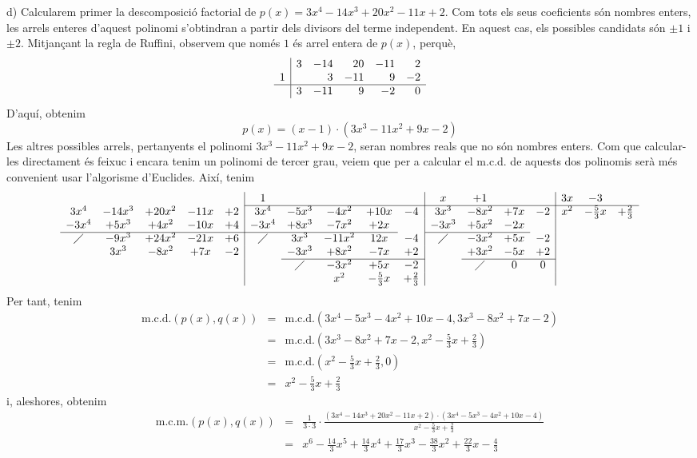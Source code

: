 \begin{solucio}
d) Calcularem primer la descomposició factorial de $p(x)=3x^{4}-14x^{3}+20x^{2}-11x+2$. Com tots els seus coeficients són nombres enters, les arrels enteres d'aquest polinomi s'obtindran a
partir dels divisors del terme independent. En aquest cas, els
possibles candidats són $\pm 1$ i $\pm 2$. Mitjançant la regla de Ruffini,
observem que només $1$ és arrel entera de $p(x)$, perquè,\[
\begin{array}{r|rrrrr}
& 3 & -14 & 20 & -11 & 2 \\
1 & & 3 & -11 & 9 & -2 \\\hline
& 3 & -11 & 9 & -2 & 0\end{array}\]D'aquí, obtenim\[
p(x)=(x-1)\cdot (3x^{3}-11x^{2}+9x-2)
\]Les altres possibles arrels, pertanyents el polinomi $3x^{3}-11x^{2}+9x-2$, seran nombres reals que no són nombres
enters. Com que calcular-les directament és feixuc i encara tenim un polinomi de tercer grau, veiem que per a calcular el m.c.d. de aquests dos polinomis
serà més convenient usar l'algorisme d'Euclides. Així, tenim\[
\begin{array}{ccccc|ccccc|cccc|ccc}
& & & & & 1 & & & & & x & +1 & & & 3x & -3 &
\\\cline{6-17} 3x^{4} & -14x^{3} & +20x^{2} & -11x & +2 & 3x^{4} &
-5x^{3} & -4x^{2} & +10x
& -4 & 3x^{3} & -8x^{2} & +7x & -2 & x^{2} & -\frac{5}{3}x & +\frac{2}{3} \\
-3x^{4} & +5x^{3} & +4x^{2} & -10x & +4 & -3x^{4} & +8x^{3} &
-7x^{2} & +2x & & -3x^{3} & +5x^{2} & -2x & & & &
\\\cline{1-5} \cline{6-9} \cline{11-13} \diagup & -9x^{3} & +24x^{2} & -21x & +6 & \diagup &
3x^{3} & -11x^{2} & 12x
& -4 & \diagup & -3x^{2} & +5x & -2 & & & \\
& 3x^{3} & -8x^{2} & +7x & -2 & & -3x^{3} & +8x^{2} & -7x & +2 &
& +3x^{2} & -5x & +2 & & & \\\cline{7-10} \cline{12-14} & & &
& & & \diagup & -3x^{2} & +5x & -2 & & \diagup & 0 & 0 & & &
\\
& & & & & & & x^{2} & -\frac{5}{3}x & +\frac{2}{3} & & & &
& & &
\end{array}\]Per tant, tenim\begin{eqnarray*}
\text{m.c.d.}\left( p(x),q(x)\right) &=&\text{m.c.d.}\left(
3x^{4}-5x^{3}-4x^{2}+10x-4,3x^{3}-8x^{2}+7x-2\right) \\
&=&\text{m.c.d.}\left( 3x^{3}-8x^{2}+7x-2,x^{2}-\frac{5}{3}x+\frac{2}{3}\right) \\
&=&\text{m.c.d.}\left( x^{2}-\frac{5}{3}x+\frac{2}{3},0\right) \\
&=&x^{2}-\frac{5}{3}x+\frac{2}{3}
\end{eqnarray*}i, aleshores, obtenim\begin{eqnarray*}
\text{m.c.m.}\left( p(x),q(x)\right) &=&\frac{1}{3\cdot 3}\cdot \frac{\left(
3x^{4}-14x^{3}+20x^{2}-11x+2\right) \cdot \left(
3x^{4}-5x^{3}-4x^{2}+10x-4\right) }{x^{2}-\frac{5}{3}x+\frac{2}{3}} \\
&=&x^{6}-\frac{14}{3}x^{5}+\frac{14}{3}x^{4}+\frac{17}{3}x^{3}-\frac{38}{3}x^{2}+\frac{22}{3}x-\frac{4}{3}
\end{eqnarray*}
\end{solucio}

